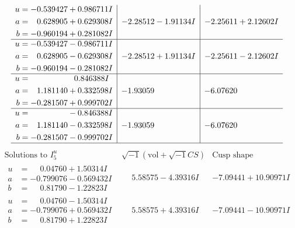 \documentclass[1p]{elsarticle_modified}
\theoremstyle{definition}
\newcommand{\I}{\sqrt{-1}}
\begin{document}
$$\begin{array}{c|c|c}
\begin{aligned}
u &= -0.539427 + 0.986711 I \\
a &= \phantom{-}0.628905 + 0.629308 I \\
b &= -0.960194 + 0.281082 I\end{aligned}
 & -2.28512 - 1.91134 I & -2.25611 + 2.12602 I \\ \hline\begin{aligned}
u &= -0.539427 - 0.986711 I \\
a &= \phantom{-}0.628905 - 0.629308 I \\
b &= -0.960194 - 0.281082 I\end{aligned}
 & -2.28512 + 1.91134 I & -2.25611 - 2.12602 I \\ \hline\begin{aligned}
u &= \phantom{-0.000000 -}0.846388 I \\
a &= \phantom{-}1.181140 + 0.332598 I \\
b &= -0.281507 + 0.999702 I\end{aligned}
 & -1.93059\phantom{ +0.000000I} & -6.07620\phantom{ +0.000000I} \\ \hline\begin{aligned}
u &= \phantom{-0.000000 } -0.846388 I \\
a &= \phantom{-}1.181140 - 0.332598 I \\
b &= -0.281507 - 0.999702 I\end{aligned}
 & -1.93059\phantom{ +0.000000I} & -6.07620\phantom{ +0.000000I}\\
 \hline 
 \end{array}$$\newpage$$\begin{array}{c|c|c}  
\text{Solutions to }I^u_{5}& \I (\text{vol} + \sqrt{-1}CS) & \text{Cusp shape}\\
 \hline 
\begin{aligned}
u &= \phantom{-}0.04760 + 1.50314 I \\
a &= -0.799076 - 0.569432 I \\
b &= \phantom{-}0.81790 - 1.22823 I\end{aligned}
 & \phantom{-}5.58575 - 4.39316 I & -7.09441 + 10.90971 I \\ \hline\begin{aligned}
u &= \phantom{-}0.04760 - 1.50314 I \\
a &= -0.799076 + 0.569432 I \\
b &= \phantom{-}0.81790 + 1.22823 I\end{aligned}
 & \phantom{-}5.58575 + 4.39316 I & -7.09441 - 10.90971 I \\ \hline\begin{aligned}

\end{aligned}
\end{array}$$
\end{document}
